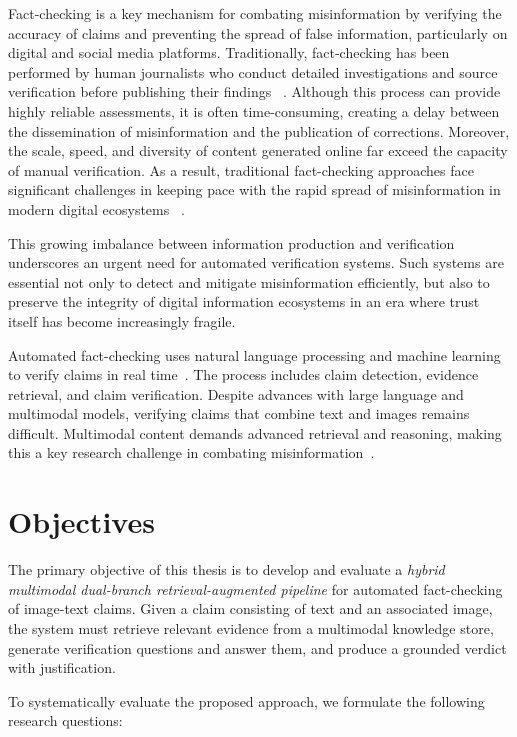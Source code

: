 Fact-checking is a key mechanism for combating misinformation by verifying the accuracy of claims and preventing the spread of false information, particularly on digital and social media platforms. Traditionally, fact-checking has been performed by human journalists who conduct detailed investigations and source verification before publishing their findings ~\cite{QuestToAutomateFactChecking2015Oct}. Although this process can provide highly reliable assessments, it is often time-consuming, creating a delay between the dissemination of misinformation and the publication of corrections. Moreover, the scale, speed, and diversity of content generated online far exceed the capacity of manual verification. As a result, traditional fact-checking approaches face significant challenges in keeping pace with the rapid spread of misinformation in modern digital ecosystems ~\cite{FactChecking2025Mar}.

This growing imbalance between information production and verification underscores an urgent need for automated verification systems. Such systems are essential not only to detect and mitigate misinformation efficiently, but also to preserve the integrity of digital information ecosystems in an era where trust itself has become increasingly fragile.

Automated fact-checking uses natural language processing and machine learning to verify claims in real time~\cite{QuestToAutomateFactChecking2015Oct}. The process includes claim detection, evidence retrieval, and claim verification. Despite advances with large language and multimodal models, verifying claims that combine text and images remains difficult. Multimodal content demands advanced retrieval and reasoning, making this a key research challenge in combating misinformation~\cite{Cao2025May}.


\section{Objectives}
\label{sec:intro:objectives}

The primary objective of this thesis is to develop and evaluate a \textit{hybrid multimodal dual-branch retrieval-augmented pipeline} for automated fact-checking of image-text claims. Given a claim consisting of text and an associated image, the system must retrieve relevant evidence from a multimodal knowledge store, generate verification questions and answer them, and produce a grounded verdict with justification.

To systematically evaluate the proposed approach, we formulate the following research questions:

